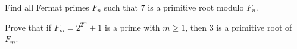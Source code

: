\documentclass{subfile}
\begin{document}


	\begin{problem}
		Find all Fermat primes $F_n$ such that $7$ is a primitive root modulo $F_n$. %
	\end{problem}


	\begin{problem}
		Prove that if $F_{m}=2^{2^{m}}+1$ is a prime with $m\geq{1}$, then $3$ is a primitive root of $F_{m}$. %
	\end{problem}

\end{document}
